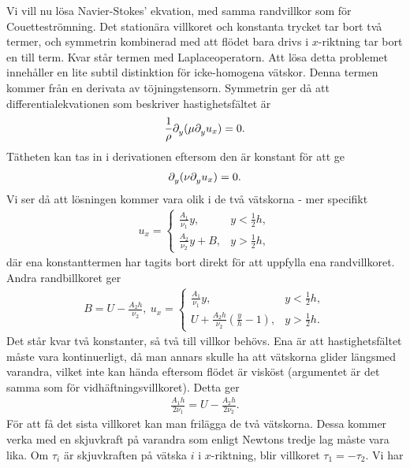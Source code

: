Vi vill nu lösa Navier-Stokes' ekvation, med samma randvillkor som för Couetteströmning. Det stationära villkoret och konstanta trycket tar bort två termer, och symmetrin kombinerad med att flödet bara drivs i $x$-riktning tar bort en till term. Kvar står termen med Laplaceoperatorn. Att lösa detta problemet innehåller en lite subtil distinktion för icke-homogena vätskor. Denna termen kommer från en derivata av töjningstensorn. Symmetrin ger då att differentialekvationen som beskriver hastighetsfältet är
\begin{align*}
	\frac{1}{\rho}\partial_{y}^{}(\mu\partial_{y}^{}u_{x}) = 0.
\end{align*}
Tätheten kan tas in i derivationen eftersom den är konstant för att ge
\begin{align*}
	\partial_{y}^{}(\nu\partial_{y}^{}u_{x}) = 0.
\end{align*}
Vi ser då att lösningen kommer vara olik i de två vätskorna - mer specifikt
\begin{align*}
	u_{x} =
	\begin{cases}
		\frac{A_{1}}{\nu_{1}}y,     & y < \frac{1}{2}h, \\
		\frac{A_{2}}{\nu_{2}}y + B, & y > \frac{1}{2}h,
	\end{cases}
\end{align*}
där ena konstanttermen har tagits bort direkt för att uppfylla ena randvillkoret. Andra randbillkoret ger
\begin{align*}
	B = U - \frac{A_{2}h}{\nu_{2}},\ u_{x} =
	\begin{cases}
		\frac{A_{1}}{\nu_{1}}y,                                 & y < \frac{1}{2}h, \\
		U + \frac{A_{2}h}{\nu_{2}}\left(\frac{y}{h} - 1\right), & y > \frac{1}{2}h.
	\end{cases}
\end{align*}
Det står kvar två konstanter, så två till villkor behövs. Ena är att hastighetsfältet måste vara kontinuerligt, då man annars skulle ha att vätskorna glider längsmed varandra, vilket inte kan hända eftersom flödet är visköst (argumentet är det samma som för vidhäftningsvillkoret). Detta ger
\begin{align*}
	\frac{A_{1}h}{2\nu_{1}} = U - \frac{A_{2}h}{2\nu_{2}}.
\end{align*}
För att få det sista villkoret kan man frilägga de två vätskorna. Dessa kommer verka med en skjuvkraft på varandra som enligt Newtons tredje lag måste vara lika. Om $\tau_{i}$ är skjuvkraften på vätska $i$ i $x$-riktning, blir villkoret $\tau_{1} = -\tau_{2}$. Vi har
